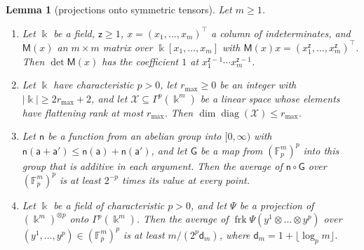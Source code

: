 \documentclass[11pt]{amsart}
\newtheorem{lemma}[theorem]{Lemma}
\theoremstyle{definition}
\theoremstyle{remark}
\numberwithin{equation}{section}
\newcommand{\F}{\mathbb F}
\newcommand{\abs}[1]{\lvert #1\rvert}
\theoremstyle{plain}
\theoremstyle{definition}
\theoremstyle{plain}
\begin{document}
\begin{lemma}[projections onto symmetric tensors]\label{amb:lem:projections}
Let $m\ge1$.
\begin{enumerate}
\item Let $\Bbbk$ be a field, $\mathsf z\ge1$, $x=(x_1,\dots,x_m)^{\top}$ a column of indeterminates, and $\mathsf M(x)$
an $m\times m$ matrix over $\Bbbk[x_1,\dots,x_m]$ with $\mathsf M(x)x=(x_1^{\mathsf z},\dots,x_m^{\mathsf z})^{\top}$. Then $\det\mathsf M(x)$ has the coefficient $1$ at
$x_1^{\mathsf z-1}\cdots x_m^{\mathsf z-1}$.
\item Let $\Bbbk$ have characteristic $p>0$, let $r_{\max}\ge0$ be an integer with $\abs\Bbbk\ge2r_{\max}+2$, and let
$\mathcal X\subseteq\Gamma^p(\Bbbk^m)$ be a linear space whose elements have flattening rank at most $r_{\max}$. Then
$\dim\operatorname{diag}(\mathcal X)\le r_{\max}$.
\item Let $\mathsf n$ be a function from an abelian group into $[0,\infty)$ with $\mathsf n(\mathsf a+\mathsf a')\le\mathsf n(\mathsf a)+\mathsf n(\mathsf a')$, and let $\mathsf G$ be a
map from $(\F_p^m)^p$ into this group that is additive in each argument. Then the average of $\mathsf n\circ\mathsf G$ over
$(\F_p^m)^p$ is at least $2^{-p}$ times its value at every point.
\item Let $\Bbbk$ be a field of characteristic $p>0$, and let $\Psi$ be a projection of $(\Bbbk^m)^{\otimes p}$ onto
$\Gamma^p(\Bbbk^m)$. Then the average of $\operatorname{frk}\Psi(y^1\otimes\dots\otimes y^p)$ over
$(y^1,\dots,y^p)\in(\F_p^m)^p$ is at least $m/(2^p\mathsf d_m)$, where $\mathsf d_m=1+\lfloor\log_pm\rfloor$.
\end{enumerate}
\end{lemma}
\end{document}
